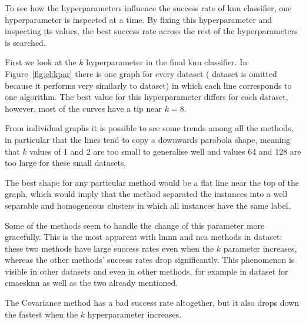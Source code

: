 \documentclass[12pt,a4paper]{report}
\begin{document}


\clearpage

To see how the hyperparameters influence the success rate of \ac{knn} classifier, one hyperparameter is inspected at a time. By fixing this hyperparameter and inspecting its values, the best success rate across the rest of the hyperparameters is searched.

First we look at the $k$ hyperparameter in the final \ac{knn} classifier. In Figure~\ref{fig:cl:kpar} there is one graph for every dataset ( dataset is omitted because it performs very similarly to  dataset) in which each line corresponds to one algorithm. The best value for this hyperparameter differs for each dataset, however, most of the curves have a tip near $k=8$.

From individual graphs it is possible to see some trends among all the methods, in particular that the lines tend to copy a downwards parabola shape, meaning that $k$ values of 1 and 2 are too small to generalise well and values 64 and 128 are too large for these small datasets.

The best shape for any particular method would be a flat line near the top of the graph, which would imply that the method separated the instances into a well separable and homogeneous clusters in which all instances have the same label.

Some of the methods seem to handle the change of this parameter more gracefully. This is the most apparent with \ac{lmnn} and \ac{nca} methods in  dataset: these two methods have large success rates even when the $k$ parameter increases, whereas the other methods' success rates drop significantly. This phenomenon is visible in other datasets and even in other methods, for example in  dataset for \ac{cmaesknn} as well as the two already mentioned.

The Covariance method has a bad success rate altogether, but it also drops down the fastest when the $k$ hyperparameter increases.
\end{document}
